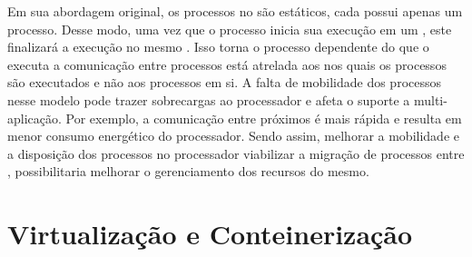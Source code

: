 
Em sua abordagem original, os processos no \nanvix são estáticos, \ie cada \cluster possui apenas um processo. Desse modo, uma vez que o processo inicia sua execução em um \cluster, este finalizará a execução no mesmo \cluster. 
Isso torna o processo dependente do \cluster que o executa \eg a comunicação entre processos está atrelada aos \clusters nos quais os processos são executados e não aos processos em si. A falta de mobilidade dos processos nesse modelo pode trazer sobrecargas ao processador e afeta o suporte a multi-aplicação. Por exemplo, a comunicação entre \clusters próximos é mais rápida e resulta em menor consumo energético do processador. Sendo assim, melhorar a mobilidade e a disposição dos processos no processador \ie viabilizar a migração de processos entre \clusters, possibilitaria melhorar o gerenciamento dos recursos do mesmo.

\section{Virtualização e Conteinerização}
\label{sec.virtualização}
